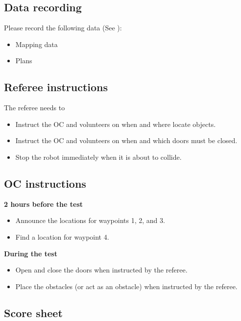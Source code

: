 \subsection{Data recording}
  Please record the following data (See ):
  \begin{itemize}
   \item Mapping data
   \item Plans
  \end{itemize}

\subsection{Referee instructions}

The referee needs to
\begin{itemize}
	\item Instruct the OC and volunteers on when and where locate objects.
	\item Instruct the OC and volunteers on when and which doors must be closed.
	\item Stop the robot immediately when it is about to collide.
\end{itemize}

\subsection{OC instructions}

\textbf{2 hours before the test}
\begin{itemize}
	\item Announce the locations for waypoints 1, 2, and 3.
	\item Find a location for waypoint 4. 
\end{itemize}

\textbf{During the test}
\begin{itemize}
	\item Open and close the doors when instructed by the referee.
	\item Place the obstacles (or act as an obstacle) when instructed by the referee.
\end{itemize}

\newpage

\subsection{Score sheet}


